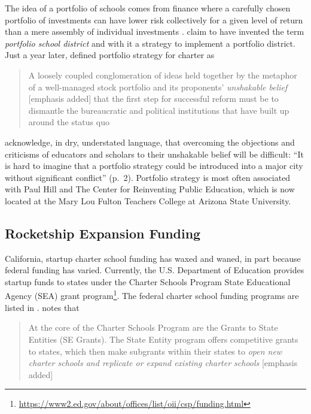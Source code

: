The idea of a portfolio of schools comes from finance where a carefully chosen portfolio of investments can have lower risk collectively for a given level of return than a mere assembly of individual investments \parencite[See ][for an overview of the mathematics of modern portfolio theory]{MarkowitzContributors2024}. \citeauthor{Hill.etal2009} claim to have invented the term \textit{portfolio school district} \parencite[1]{Hill.etal2009} and with it a strategy to implement a portfolio district. Just a year later, \citeauthor{Henig.etal2010} defined portfolio strategy for charter as

\blockquote[{\parencite{Henig.etal2010}}][]{\OnehalfSpacing%
A loosely coupled conglomeration of ideas held together by the metaphor of a well-managed stock portfolio and its proponents’ \textit{unshakable belief} [emphasis added] that the first step for successful reform must be to dismantle the bureaucratic and political institutions that have built up around the status quo}.\vspace{-0.25\baselineskip}

\citeauthor{Hill.etal2009} acknowledge, in dry, understated language, that overcoming the objections and criticisms of educators and scholars to their unshakable belief will be difficult: ``It is hard to imagine that a portfolio strategy could be introduced into a major city without significant conflict'' (p.~2). Portfolio strategy is most often associated with Paul Hill and The Center for Reinventing Public Education, which is now located at the Mary Lou Fulton Teachers College at Arizona State University.

\subsection{Rocketship Expansion Funding}\label{sec:rocketship-expansion-funding}\indent

California, startup charter school funding has waxed and waned, in part because federal funding has varied. Currently, the U.S. Department of Education provides startup funds to states under the Charter Schools Program State Educational Agency (SEA) grant program\footnote{\url{https://www2.ed.gov/about/offices/list/oii/csp/funding.html}}. The federal charter school funding programs are listed in \textcite{NCSRC2020}.  notes that 

\blockquote[{\parencite{NAPCS2020}}][]{\OnehalfSpacing%
At the core of the Charter Schools Program are the Grants to State Entities (SE Grants). The State Entity program offers competitive grants to states, which then make subgrants within their states to \textit{open new charter schools and replicate or expand existing charter schools} [emphasis added]}. 


